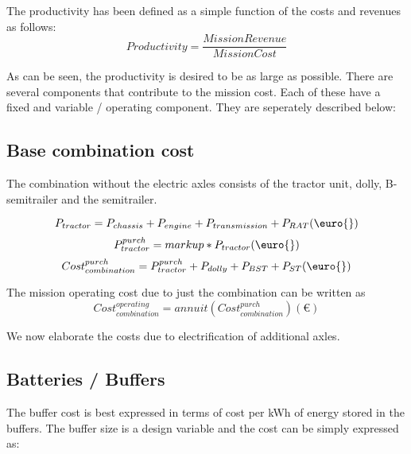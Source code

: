 \documentclass[ExampleMasters.tex]{subfiles}
\begin{document}
		The productivity has been defined as a simple function of the costs and revenues as follows:\\

		\begin{equation}
			Productivity = \frac{Mission Revenue}{Mission Cost}
		\end{equation}

		As can be seen, the productivity is desired to be as large as possible. There are several components that contribute to the mission cost. Each of these have a fixed and variable / operating component. They are seperately described below:\\

		\subsection{Base combination cost}

			The combination without the electric axles consists of the tractor unit, dolly, B-semitrailer and the semitrailer. 

			\begin{equation}
				P_{tractor} = P_{chassis}+P_{engine}+P_{transmission}+P_{RAT}  (\euro{})\\
			\end{equation}
			\begin{equation}
				P_{tractor}^{purch}= markup*P_{tractor} (\euro{})\\
			\end{equation}
			\begin{equation}
				Cost_{combination}^{purch} = P_{tractor}^{purch}+P_{dolly}+P_{BST}+P_{ST} (\euro{})\\
			\end{equation}

			The mission operating cost due to just the combination can be written as 
			\begin{equation}
				Cost_{combination}^{operating} = annuit(Cost_{combination}^{purch}) (\euro{})
			\end{equation}

			We now elaborate the costs due to electrification of additional axles.

		\subsection{Batteries / Buffers}

			The buffer cost is best expressed in terms of cost per kWh of energy stored in the buffers. The buffer size is a design variable and the cost can be simply expressed as:
\end{document}
